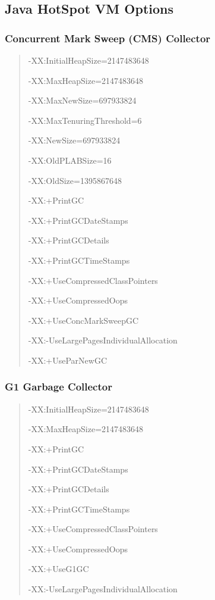 \documentclass[11pt,a4paper]{article}
\begin{document}
\newpage
\subsection{Java HotSpot VM Options}
\subsubsection*{Concurrent Mark Sweep (CMS) Collector}
\begin{quote}
-XX:InitialHeapSize=2147483648

-XX:MaxHeapSize=2147483648

-XX:MaxNewSize=697933824

-XX:MaxTenuringThreshold=6

-XX:NewSize=697933824

-XX:OldPLABSize=16

-XX:OldSize=1395867648

-XX:+PrintGC

-XX:+PrintGCDateStamps

-XX:+PrintGCDetails

-XX:+PrintGCTimeStamps

-XX:+UseCompressedClassPointers

-XX:+UseCompressedOops

-XX:+UseConcMarkSweepGC

-XX:-UseLargePagesIndividualAllocation

-XX:+UseParNewGC
\end{quote}

\subsubsection*{G1 Garbage Collector}
\begin{quote}
-XX:InitialHeapSize=2147483648

-XX:MaxHeapSize=2147483648

-XX:+PrintGC

-XX:+PrintGCDateStamps

-XX:+PrintGCDetails

-XX:+PrintGCTimeStamps

-XX:+UseCompressedClassPointers

-XX:+UseCompressedOops

-XX:+UseG1GC

-XX:-UseLargePagesIndividualAllocation
\end{quote}

\newpage
\end{document}
